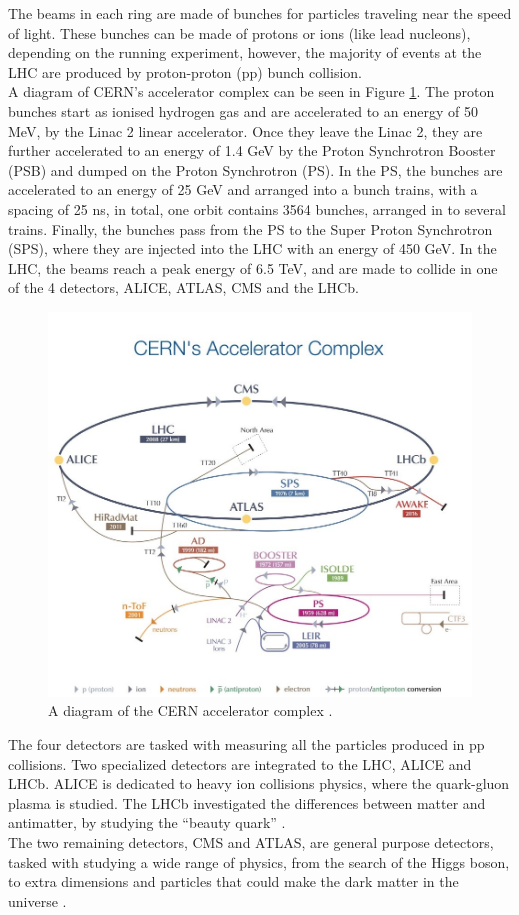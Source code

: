  The beams in each ring are made of bunches for particles traveling near the speed of light. These bunches can be made of protons or ions (like lead nucleons), depending on the running experiment, however, the majority of events at the LHC are produced by proton-proton (pp) bunch collision.\\
A diagram of CERN’s accelerator complex can be seen in Figure \ref{cernc}. The proton bunches start as ionised hydrogen gas and are accelerated to an energy of 50 MeV, by the Linac 2 linear accelerator. Once they leave the Linac 2, they are further accelerated to an energy of 1.4 GeV by the Proton Synchrotron Booster (PSB) and dumped on the  Proton Synchrotron (PS). In the PS, the bunches are accelerated to an energy of 25 GeV and arranged into a bunch trains, with a spacing of 25 ns, in total, one orbit contains 3564 bunches, arranged in to several trains. Finally, the bunches pass from the PS to the Super Proton Synchrotron (SPS), where they are injected into the LHC with an energy of 450 GeV. In the LHC, the beams reach a peak energy of 6.5 TeV, and are made to collide in one of the 4 detectors, ALICE, ATLAS, CMS and the LHCb. 
\begin{center}
  \begin{figure}[ht]
    \centering
    \includegraphics[scale=.7]{Chapter2/CERNC.jpg}
    \caption[CERN accelerator complex.]{A diagram of the CERN accelerator complex \cite{cernpg}.}
    \label{cernc}
  \end{figure}
\end{center}
The four detectors are tasked with measuring all the particles produced in pp collisions. Two specialized detectors are integrated to the LHC, ALICE and LHCb. ALICE is dedicated to heavy ion collisions physics, where the quark-gluon plasma is studied. The LHCb investigated the differences between matter and antimatter, by studying the “beauty quark” \cite{lhcb}.\\
The two remaining detectors, CMS and ATLAS, are general purpose detectors, tasked with studying a wide range of physics, from the search of the Higgs boson, to extra dimensions and particles that could make the dark matter in the universe \cite{cmsweb}.

